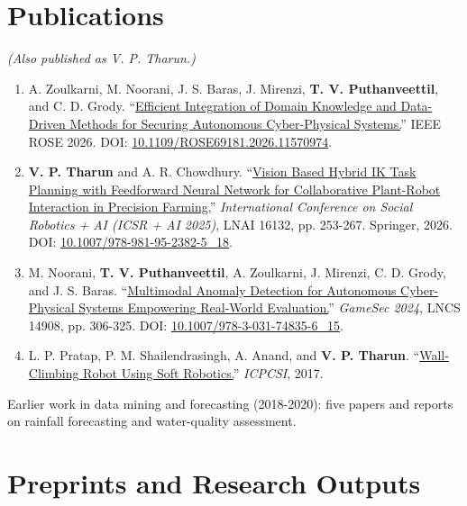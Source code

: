 \section{Publications}
\textit{(Also published as V. P. Tharun.)}

\begin{enumerate}[leftmargin=18pt,itemsep=2.4pt,topsep=2pt]
\item A. Zoulkarni, M. Noorani, J. S. Baras, J. Mirenzi, \textbf{T. V. Puthanveettil}, and C. D. Grody. ``\href{https://scholar.google.com/citations?view_op=view_citation\&hl=en\&user=Vre9wQQAAAAJ\&citation_for_view=Vre9wQQAAAAJ:aqlVkmm33-oC}{Efficient Integration of Domain Knowledge and Data-Driven Methods for Securing Autonomous Cyber-Physical Systems.}'' IEEE ROSE 2026. DOI: \href{https://doi.org/10.1109/ROSE69181.2026.11570974}{10.1109/ROSE69181.2026.11570974}.
\item \textbf{V. P. Tharun} and A. R. Chowdhury. ``\href{https://www.researchgate.net/publication/399369200_Vision_Based_Hybrid_IK_Task_Planning_with_Feedforward_Neural_Network_for_Collaborative_Plant-Robot_Interaction_in_Precision_Farming}{Vision Based Hybrid IK Task Planning with Feedforward Neural Network for Collaborative Plant-Robot Interaction in Precision Farming.}'' \textit{International Conference on Social Robotics + AI (ICSR + AI 2025)}, LNAI 16132, pp. 253-267. Springer, 2026. DOI: \href{https://doi.org/10.1007/978-981-95-2382-5_18}{10.1007/978-981-95-2382-5\_18}.
\item M. Noorani, \textbf{T. V. Puthanveettil}, A. Zoulkarni, J. Mirenzi, C. D. Grody, and J. S. Baras. ``\href{https://doi.org/10.1007/978-3-031-74835-6_15}{Multimodal Anomaly Detection for Autonomous Cyber-Physical Systems Empowering Real-World Evaluation.}'' \textit{GameSec 2024}, LNCS 14908, pp. 306-325. DOI: \href{https://doi.org/10.1007/978-3-031-74835-6_15}{10.1007/978-3-031-74835-6\_15}.
\item L. P. Pratap, P. M. Shailendrasingh, A. Anand, and \textbf{V. P. Tharun}. ``\href{https://ieeexplore.ieee.org/abstract/document/8392038}{Wall-Climbing Robot Using Soft Robotics.}'' \textit{ICPCSI}, 2017.
\end{enumerate}
Earlier work in data mining and forecasting (2018-2020): five papers and reports on rainfall forecasting and water-quality assessment. 
\section{Preprints and Research Outputs}

